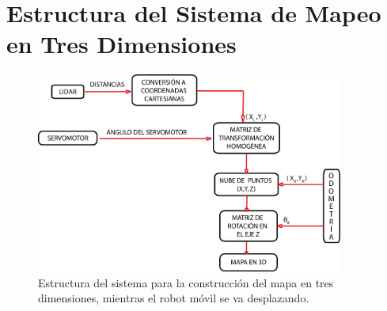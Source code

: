 


\section{Estructura del Sistema de Mapeo en Tres Dimensiones}

\begin{figure}%
	\centering \footnotesize
	\includegraphics[width=0.9\textwidth]{images/estructura_3d.png}
	\captionsetup{font=footnotesize}
	\caption{Estructura del sistema para la construcción del mapa en tres dimensiones, mientras el robot móvil
	se va desplazando.}
	\label{fig:Sist3D}
\end{figure}

